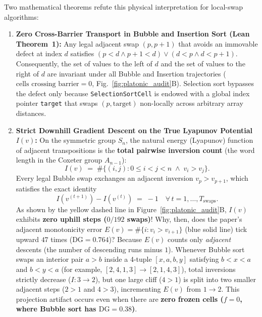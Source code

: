 \documentclass[11pt,a4paper]{article}
\theoremstyle{definition}
\theoremstyle{remark}
\newcommand{\DG}{\mathrm{DG}}
\begin{document}
Two mathematical theorems refute this physical interpretation for local-swap algorithms:
\begin{enumerate}
  \item \textbf{Zero Cross-Barrier Transport in Bubble and Insertion Sort (Lean Theorem~1):} Any legal adjacent swap $(p, p+1)$ that avoids an immovable defect at index $d$ satisfies $(p < d \land p+1 < d) \lor (d < p \land d < p+1)$. Consequently, the set of values to the left of $d$ and the set of values to the right of $d$ are invariant under all Bubble and Insertion trajectories ($\text{cells crossing barrier} = 0$, Fig.~\ref{fig:platonic_audit}B). Selection sort bypasses the defect only because \texttt{SelectionSortCell} is endowed with a global index pointer \texttt{target} that swaps $(p, \text{target})$ non-locally across arbitrary array distances.
  \item \textbf{Strict Downhill Gradient Descent on the True Lyapunov Potential $I(v)$:} On the symmetric group $S_n$, the natural energy (Lyapunov) function of adjacent transpositions is the \textbf{total pairwise inversion count} (the word length in the Coxeter group $A_{n-1}$):
  \begin{equation}
    I(v) \;=\; \#\bigl\{(i, j) : 0 \le i < j < n \;\land\; v_i > v_j\bigr\}.
  \end{equation}
  Every legal Bubble swap exchanges an adjacent inversion $v_p > v_{p+1}$, which satisfies the exact identity
  \begin{equation}
    I(v^{(t+1)}) - I(v^{(t)}) \;=\; -1 \quad \forall\, t = 1, \dots, T_{\text{swaps}}.
  \end{equation}
  As shown by the yellow dashed line in Figure~\ref{fig:platonic_audit}B, $I(v)$ exhibits \textbf{zero uphill steps ($0/192$ swaps)}! Why, then, does the paper's adjacent monotonicity error $E(v) = \#\{i : v_i > v_{i+1}\}$ (blue solid line) tick upward $47$ times ($\DG = 0.764$)? Because $E(v)$ counts only \emph{adjacent} descents (the number of descending runs minus $1$). Whenever Bubble sort swaps an interior pair $a > b$ inside a 4-tuple $[x, a, b, y]$ satisfying $b < x < a$ and $b < y < a$ (for example, $[2, 4, 1, 3] \to [2, 1, 4, 3]$), total inversions strictly decrease ($I: 3 \to 2$), but one large cliff ($4 > 1$) is split into two smaller adjacent steps ($2 > 1$ and $4 > 3$), incrementing $E(v)$ from $1 \to 2$. This projection artifact occurs even when there are \textbf{zero frozen cells ($f = 0$, where Bubble sort has $\DG = 0.38$)}.
\end{enumerate}
\end{document}
